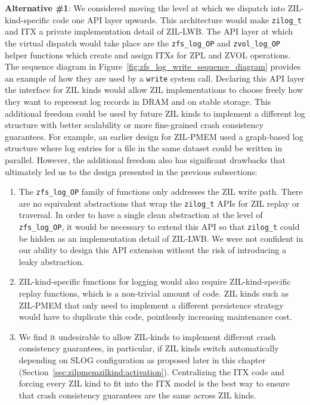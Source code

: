 \documentclass[12pt,a4paper,twoside]{book}
\begin{document}
{\textbf{Alternative \#1}: We considered moving the level at which we dispatch into ZIL-kind-specific code one API layer upwards.
This architecture would make \lstinline{zilog_t} and ITX a private implementation detail of ZIL-LWB.
The API layer at which the virtual dispatch would take place are the \lstinline{zfs_log_OP} and \lstinline{zvol_log_OP} helper functions which create and assign ITXs for ZPL and ZVOL operations.
The sequence diagram in Figure~\ref{fig:zfs_log_write_sequence_diagram} provides an example of how they are used by a \lstinline{write} system call.
Declaring this API layer the interface for ZIL kinds would allow ZIL implementations to choose freely how they want to represent log records in DRAM and on stable storage.
This additional freedom could be used by future ZIL kinds to implement a different log structure with better scalability or more fine-grained crash consistency guarantees.
For example, an earlier design for ZIL-PMEM used a graph-based log structure where log entries for a file in the same dataset could be written in parallel.
However, the additional freedom also has significant drawbacks that ultimately led us to the design presented in the previous subsections:
\begin{enumerate}[noitemsep]
    \item The \lstinline{zfs_log_OP} family of functions only addresses the ZIL write path.
        There are no equivalent abstractions that wrap the \lstinline{zilog_t} APIs for ZIL replay or traversal.
        In order to have a single clean abstraction at the level of \lstinline{zfs_log_OP}, it would be necessary to extend this API so that \lstinline{zilog_t} could be hidden as an implementation detail of ZIL-LWB.
        We were not confident in our ability to design this API extension without the risk of introducing a leaky abstraction.
    \item ZIL-kind-specific functions for logging would also require ZIL-kind-specific replay functions, which is a non-trivial amount of code.
        ZIL kinds such as ZIL-PMEM that only need to implement a different persistence strategy would have to duplicate this code, pointlessly increasing maintenance cost.
    \item We find it undesirable to allow ZIL-kinds to implement different crash consistency guarantees, in particular, if ZIL kinds switch automatically depending on SLOG configuration as proposed later in this chapter (Section~\ref{sec:zilpmemzilkind:activation}).
        Centralizing the ITX code and forcing every ZIL kind to fit into the ITX model is the best way to ensure that crash consistency guarantees are the same across ZIL kinds.
\end{enumerate}

}
\end{document}
